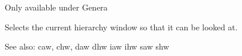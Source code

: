 
Only available under Genera

Selects the current hierarchy window so that it can be looked at.

See also: caw, chw, daw dhw iaw ihw saw shw

